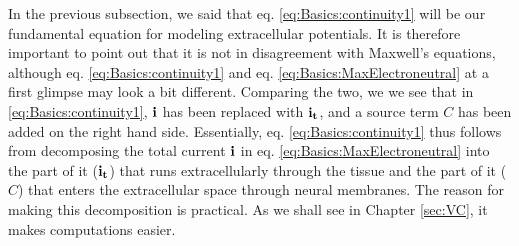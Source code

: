 In the previous subsection, we said that eq. \ref{eq:Basics:continuity1} will be our fundamental equation for modeling extracellular potentials. It is therefore important to point out that it is not in disagreement with Maxwell's equations, although eq. \ref{eq:Basics:continuity1} and eq. \ref{eq:Basics:MaxElectroneutral} at a first glimpse may look a bit different. Comparing the two, we we see that in \ref{eq:Basics:continuity1}, ${\bf i}$ has been replaced with ${\bf i_t}$, and a source term $C$ has been added on the right hand side. Essentially, eq. \ref{eq:Basics:continuity1} thus follows from decomposing the total current ${\bf i}$ in eq. \ref{eq:Basics:MaxElectroneutral} into the part of it ($\bf{i_t}$) that runs extracellularly through the tissue and the part of it ($C$) that enters the extracellular space through neural membranes. The reason for making this decomposition is practical. As we shall see in Chapter \ref{sec:VC}, it makes computations easier.





